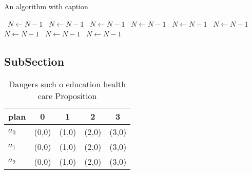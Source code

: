 \documentclass[a4paper]{article}
\begin{document}
\begin{algorithm}
\caption{An algorithm with caption}
\begin{algorithmic}
\    \State $N \gets N - 1$
\    \State $N \gets N - 1$
\    \State $N \gets N - 1$
\    \State $N \gets N - 1$
\    \State $N \gets N - 1$
\    \State $N \gets N - 1$
\    \State $N \gets N - 1$
\    \State $N \gets N - 1$
\    \State $N \gets N - 1$
\EndWhile
\end{algorithmic}
\end{algorithm}

\subsection{SubSection}

\begin{table}
\begin{adjustbox}{width=0.5\columnwidth}
\begin{tabular}{|l|l|l|l|l|}
\hline
\textbf{plan} & \multicolumn{1}{c|}{\textbf{0}} & \multicolumn{1}{c|}{\textbf{1}} & \multicolumn{1}{c|}{\textbf{2}} & \multicolumn{1}{c|}{\textbf{3}} \\ \hline
\textbf{$a_0$}  & (0,0) & (1,0) & (2,0) & (3,0) \\ \hline
\textbf{$a_1$}  & (0,0) & (1,0) & (2,0) & (3,0) \\ \hline
\textbf{$a_2$}  & (0,0) & (1,0) & (2,0) & (3,0) \\ \hline
\end{tabular}
\end{adjustbox}
\caption{Dangers such o education health care Proposition 
}
\end{table}
\end{document}
